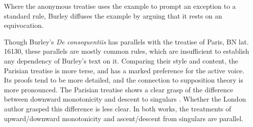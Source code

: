 \documentclass[]{birkjour}
\begin{document}
Where the anonymous treatise uses the example to prompt an exception to a standard rule, Burley diffuses the example by arguing that it rests on an equivocation.
	
Though Burley's \textit{De consequentiis} has parallels with the treatise of Paris, BN lat. 16130, these parallels are mostly common rules, which are insufficient to establish any dependency of Burley's text on it. Comparing their style and content, the Parisian treatise is more terse, and has a marked preference for the active voice. Its proofs tend to be more detailed, and the connection to supposition theory is more pronounced. The Parisian treatise shows a clear grasp of the difference between downward monotonicity and descent to singulars \autocite[p. 12, par. 2]{Green-Pedersen1980a}. Whether the London author grasped this difference is less clear. In both works, the treatments of upward/downward monotonicity and ascent/descent from singulars are parallel.
	
\end{document}
